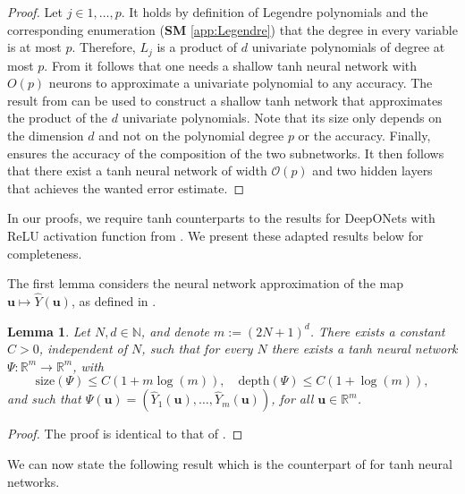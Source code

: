 \documentclass{article}
\numberwithin{equation}{section}
\newcommand{\size}{\mathrm{size}}
\newcommand{\depth}{\mathrm{depth}}
\renewcommand{\hat}{\widehat}
\newcommand{\R}{\mathbb{R}}
\newcommand{\N}{\mathbb{N}}
\renewcommand{\hat}{\widehat}
\newcommand{\1}{\mathbbm{1}}
\newcommand{\bigO}{\mathcal{O}}
\newtheorem{lemma}[theorem]{Lemma}
\begin{document}
\begin{proof}
Let $j\in{1,\ldots,p}$. It holds by definition of Legendre polynomials and the corresponding enumeration (\textbf{SM} \ref{app:Legendre}) that the degree in every variable is at most $p$. Therefore, $L_j$ is a product of $d$ univariate polynomials of degree at most $p$. 
From \cite[Lemma 3.2]{deryck2021approximation} it follows that one needs a shallow tanh neural network with $O(p)$ neurons to approximate a univariate polynomial to any accuracy. The result from \cite[Corollary 3.7]{deryck2021approximation} can be used to construct a shallow tanh network that approximates the product of the $d$ univariate polynomials. Note that its size only depends on the dimension $d$ and not on the polynomial degree $p$ or the accuracy. 
Finally, \cite[Lemma A.7]{deryck2021approximation} ensures the accuracy of the composition of the two subnetworks. It then follows that there exist a tanh neural network of width $\bigO(p)$ and two hidden layers that achieves the wanted error estimate. 
\end{proof}

In our proofs, we require tanh counterparts to the results for DeepONets with ReLU activation function from \cite{LMK1}. We present these adapted results below for completeness. 

The first lemma considers the neural network approximation of the map $\bm{u}\mapsto \hat{Y}(\bm{u})$, as defined in \cite[Eq. (3.59)]{LMK1}. 


\begin{lemma} \label{lem:Yhat-NN}
Let $N,d \in \N$, and denote $m := (2N+1)^d$. There exists a constant $C>0$, independent of $N$, such that for every $N$ there exists a tanh neural network $\Psi: \R^m \to \R^m$, with 
\begin{equation}
   \size(\Psi) \le C(1+m\log(m)), 
\quad
\depth(\Psi) \le C(1+\log(m)), 
\end{equation}
and such that $\Psi(\bm{u}) = (\hat{Y}_{1}(\bm{u}),\dots, \hat{Y}_{m}(\bm{u}))$, for all $\bm{u}\in \R^m$.
\end{lemma}
\begin{proof}
The proof is identical to that of \cite[Lemma 3.28]{LMK1}.
\end{proof}

We can now state the following result  \cite[Theorem 3.10]{SZ1} which is the counterpart of \cite[Theorem 3.32]{LMK1} for tanh neural networks.
\end{document}
